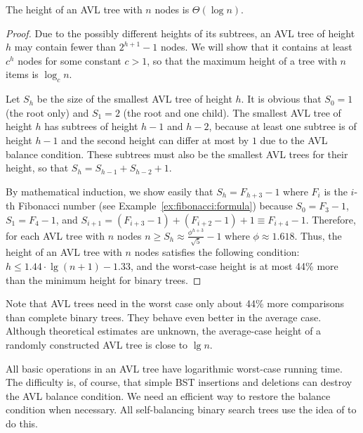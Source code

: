 \begin{Lemma}
The height of an AVL tree with $n$ nodes is $\Theta(\log n)$.
\end{Lemma}
\begin{proof}

Due to the possibly different heights of its subtrees, an
AVL tree of height $h$ may contain fewer than $2^{h+1}-1$ nodes.
We will show that it contains at least $c^{h}$ nodes for some constant $c>1$, 
so that the maximum height of a tree with $n$ items is $\log_{c}n$.

Let $S_{h}$ be the size of the smallest AVL tree of height $h$. It is
obvious that $S_{0}=1$ (the root only) and $S_{1}=2$ (the root and one
child). The smallest AVL tree of height $h$ has subtrees of height $h-1$
and $h-2$, because at least one subtree is of height $h-1$ and the second
height can differ at most by $1$ due to the AVL balance condition. These
subtrees must also be the smallest AVL trees for their height, so that $S_{h}=
S_{h-1}+S_{h-2}+1$. 

By mathematical induction, we show easily that
$S_{h}=F_{h+3}-1$  where $F_{i}$ is the $i$-th Fibonacci number
(see Example~\ref{ex:fibonacci:formula})
because $S_{0} = F_{3}-1$, $S_{1} = F_{4}-1$, and $S_{i+1}=
(F_{i+3}-1)+(F_{i+2}-1)+1 \equiv F_{i+4}-1$. Therefore, 
for each AVL tree with $n$ nodes
\(
n \ge S_{h} \approx \frac{\phi^{h+3}}{\sqrt{5}} - 1
\)
where $\phi \approx 1.618$. Thus, 
the height of an AVL tree with $n$ nodes satisfies
the following condition:
\(
h \le 1.44 \cdot \lg (n+1) - 1.33
\),
and the worst-case height is at most 44\% more than the minimum height for
binary trees. 
\end{proof}

Note that AVL trees need in the worst case only about 44\% more comparisons than
complete binary trees. They behave even better in the average case. 
Although theoretical estimates are unknown, the average-case height of a
randomly constructed AVL tree is close to $\lg n$. 

All basic operations in an AVL tree have logarithmic worst-case running time. 
The difficulty is, of course, that simple BST insertions and deletions can 
destroy the AVL balance condition. We need an efficient way to restore the 
balance condition when necessary. All self-balancing binary search trees use 
the idea of  to do this.

